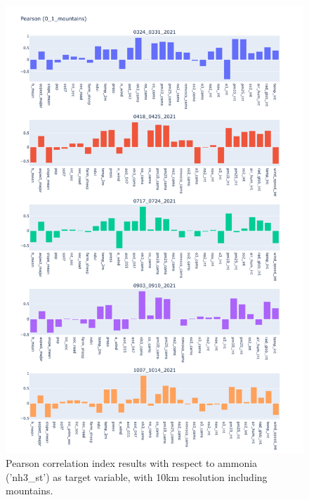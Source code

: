 \begin{figure}[H]
    \centering
    \includegraphics[scale=0.35]{images/tests/0_1_mountainsnh3_st_pearson.png}
    \caption{Pearson correlation index results with respect to ammonia ('nh3\_st') as target variable, with 10km resolution including mountains.}
    \label{fig:overview}
\end{figure}

